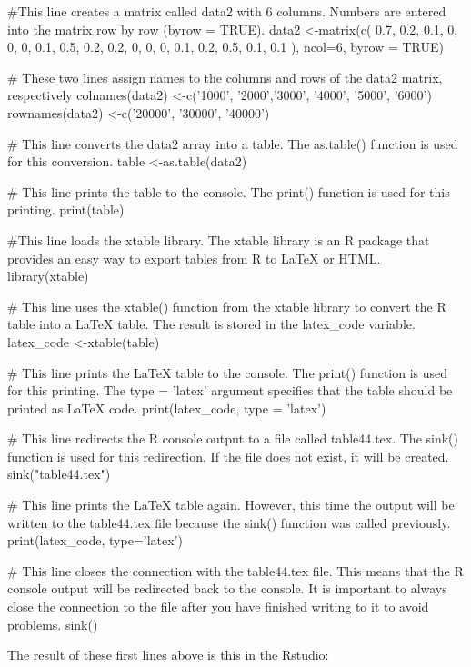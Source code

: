 \documentclass{article}
\begin{document}
\begin{spverbatim}

#This line creates a matrix called data2 with 6 columns. Numbers are entered into the matrix row by row (byrow = TRUE).
data2 <-matrix(c(
  0.7, 0.2, 0.1, 0, 0, 0,
  0.1, 0.5, 0.2, 0.2, 0, 0, 
  0, 0.1, 0.2, 0.5, 0.1, 0.1
), ncol=6, byrow = TRUE)

# These two lines assign names to the columns and rows of the data2 matrix, respectively
colnames(data2) <-c('1000', '2000','3000', '4000', '5000', '6000')
rownames(data2) <-c('20000', '30000', '40000')

# This line converts the data2 array into a table. The as.table() function is used for this conversion.
table <-as.table(data2)

# This line prints the table to the console. The print() function is used for this printing.
print(table)

#This line loads the xtable library. The xtable library is an R package that provides an easy way to export tables from R to LaTeX or HTML.
library(xtable)

# This line uses the xtable() function from the xtable library to convert the R table into a LaTeX table. The result is stored in the latex_code variable.
latex_code <-xtable(table)

# This line prints the LaTeX table to the console. The print() function is used for this printing. The type = 'latex' argument specifies that the table should be printed as LaTeX code.
print(latex_code, type = 'latex')

# This line redirects the R console output to a file called table44.tex. The sink() function is used for this redirection. If the file does not exist, it will be created.
sink("table44.tex")

# This line prints the LaTeX table again. However, this time the output will be written to the table44.tex file because the sink() function was called previously.
print(latex_code, type='latex')

# This line closes the connection with the table44.tex file. This means that the R console output will be redirected back to the console. It is important to always close the connection to the file after you have finished writing to it to avoid problems.
sink()
\end{spverbatim}
The result of these first lines above is this in the Rstudio:
\end{document}

